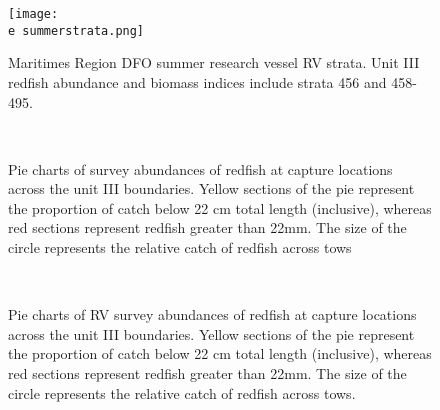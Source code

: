 \documentclass[11pt]{article}
\newcommand{\D}{.}
\newcommand{\e}{/home/ecomod_data/redfish/figures/}
\begin{document}
\begin{figure}
    
    \texttt{[image: \\e summerstrata.png]}
    \caption{Maritimes Region DFO summer research vessel RV strata. Unit III redfish abundance and biomass indices include strata 456 and 458-495.}

\end{figure}
\clearpage
\begin{landscape}
\begin{figure}
\centering
{}
\\
\caption{Pie charts of survey abundances of redfish at capture locations across the unit III boundaries. Yellow sections of the pie represent the proportion of catch below 22 cm total length (inclusive), whereas red sections represent redfish greater than 22mm. The size of the circle represents the relative catch of redfish across tows }
\end{figure}
\clearpage


\centering
\begin{figure}
\\
\caption{Pie charts of RV survey abundances of redfish at capture locations across the unit III boundaries. Yellow sections of the pie represent the proportion of catch below 22 cm total length (inclusive), whereas red sections represent redfish greater than 22mm. The size of the circle represents the relative catch of redfish across tows. }

\end{figure}
\end{landscape}
\clearpage
\end{document}
